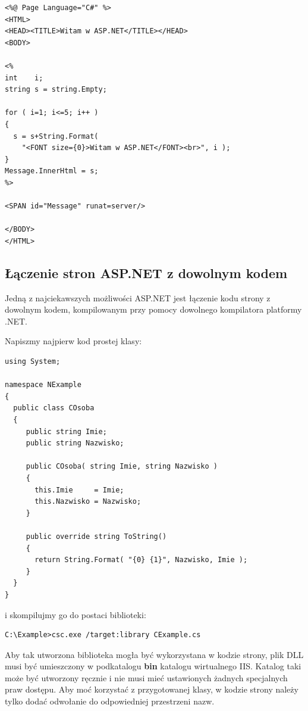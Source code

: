 \begin{scriptsize}
\begin{verbatim}
<%@ Page Language="C#" %>
<HTML>
<HEAD><TITLE>Witam w ASP.NET</TITLE></HEAD>
<BODY>

<%
int    i;
string s = string.Empty;

for ( i=1; i<=5; i++ )
{
  s = s+String.Format( 
    "<FONT size={0}>Witam w ASP.NET</FONT><br>", i );
}
Message.InnerHtml = s;
%>

<SPAN id="Message" runat=server/>

</BODY>
</HTML>
\end{verbatim}
\end{scriptsize}

\subsection{Łączenie stron ASP.NET z dowolnym kodem}

Jedną z najciekawszych możliwości ASP.NET jest łączenie kodu strony z dowolnym kodem, kompilowanym
przy pomocy dowolnego kompilatora platformy .NET. 

Napiszmy najpierw kod prostej klasy:

\begin{scriptsize}
\begin{verbatim}
using System;

namespace NExample
{
  public class COsoba
  {
     public string Imie;
     public string Nazwisko;

     public COsoba( string Imie, string Nazwisko )
     {
       this.Imie     = Imie; 
       this.Nazwisko = Nazwisko;
     }

     public override string ToString()
     {
       return String.Format( "{0} {1}", Nazwisko, Imie );
     }
  }
}
\end{verbatim}
\end{scriptsize}

i skompilujmy go do postaci biblioteki:

\begin{scriptsize}
\begin{verbatim}
C:\Example>csc.exe /target:library CExample.cs
\end{verbatim}
\end{scriptsize}

Aby tak utworzona biblioteka mogła być wykorzystana w kodzie strony, plik DLL musi być umieszczony
w podkatalogu {\bf bin} katalogu wirtualnego IIS. Katalog taki może być utworzony ręcznie i nie musi
mieć ustawionych żadnych specjalnych praw dostępu.
Aby moć korzystać z przygotowanej klasy, w kodzie strony należy tylko dodać odwołanie do odpowiedniej
przestrzeni nazw. 

